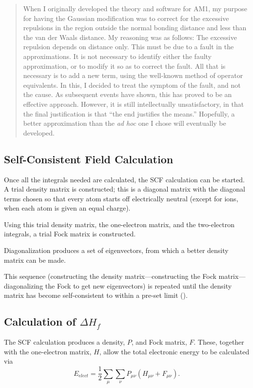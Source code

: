 \begin{quote}
When I originally developed the theory and software for AM1, my purpose
for having the Gaussian modification was to correct for the excessive
repulsions in the region outside the normal bonding distance and less than the
van der Waals distance.  My reasoning was  as follows:  The excessive repulsion
depends on distance only.  This must be due to a fault in the approximations.
It is not necessary to identify either the faulty approximation, or to modify
it so as to correct the fault.  All that is necessary is to add a new term,
using the well-known method of operator equivalents. In this, I decided to treat the
symptom of the fault, and not the cause.  As subsequent events have shown, this
has proved to be an effective approach.  However, it is still intellectually
unsatisfactory, in that the final justification is that ``the end justifies
the means.''  Hopefully, a better approximation than the {\em ad hoc} one
I chose will eventually be developed.
\end{quote}

\subsection{Self-Consistent Field Calculation}
Once all the integrals needed are calculated, the SCF calculation can be
started.  A trial density matrix is constructed; this is a diagonal matrix
with the diagonal terms chosen so that every atom starts off electrically
neutral (except for ions, when each atom is given an equal charge).

Using this trial density matrix, the one-electron matrix, and the
two-electron integrals,  a trial Fock matrix is constructed.

Diagonalization produces a set of eigenvectors, from which a better
density matrix can be made.

This sequence (constructing the density matrix---constructing the Fock
matrix---diagonalizing the Fock to get new eigenvectors) is repeated until the
density matrix has become self-consistent to within a pre-set limit
().

\subsection{Calculation of $\Delta H_f$}

The SCF calculation produces a density, $P$, and Fock
matrix, $F$. These, together with the one-electron matrix, $H$,
allow the total electronic energy to be calculated via
$$
 E_{elect} = \frac{1}{2}\sum_{\mu}\sum_{\nu}P_{\mu\nu}(H_{\mu\nu}+F_{\mu\nu}).
$$

